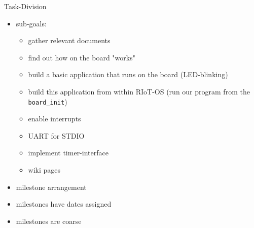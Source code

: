 \documentclass[9pt]{beamer}
\begin{document}
\begin{frame}{Task-Division}
\pause
 \begin{itemize}
 \item sub-goals:
\pause
 \begin{itemize}
 \item gather relevant documents
\pause
 \item find out how on the board "works"
\pause
 \item build a basic application that runs on the board (LED-blinking)
\pause
 \item build this application from within RIoT-OS (run our program from the \texttt{board\_init})
\pause
 \item enable interrupts
\pause
 \item UART for STDIO
\pause
 \item implement timer-interface
\pause
 \item wiki pages
\pause
 \end{itemize}
 \item milestone arrangement
\pause
 \item milestones have dates assigned
\pause
 \item milestones are coarse
 \end{itemize}
\end{frame}
\end{document}
